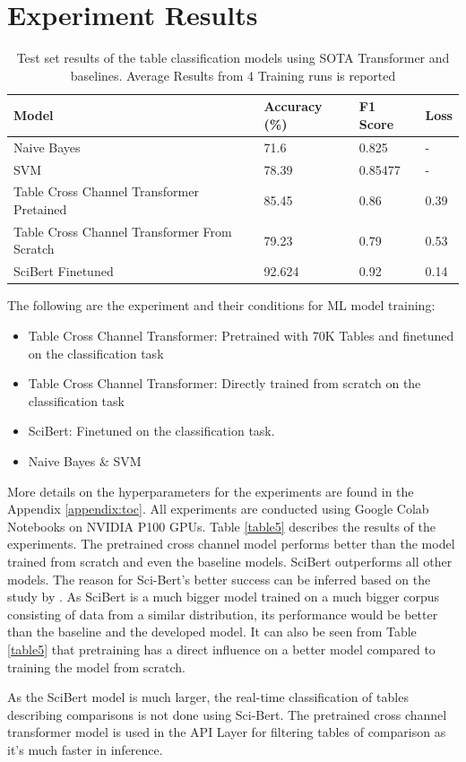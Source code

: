 \section{Experiment Results}
\label{table_classification:experiement-result}
\begin{table}[h]
    \label{table\arabic{tablecounter}}
    \centering
    \begin{tabular}{|l|l|l|l|}
    \hline
        \textbf{Model} & \textbf{Accuracy} (\%) & \textbf{F1 Score}  & \textbf{Loss} \\ \hline
        Naive Bayes & 71.6 & 0.825 & - \\ \hline
        SVM  & 78.39 & 0.85477 & - \\ \hline
        Table Cross Channel Transformer Pretained & 85.45 & 0.86 & 0.39 \\ \hline
        Table Cross Channel Transformer From Scratch & 79.23 & 0.79 & 0.53 \\ \hline
        SciBert Finetuned & 92.624 & 0.92 & 0.14 \\ \hline
    \end{tabular}
    \caption{\label{tablecounter} Test set results of the table classification models using SOTA Transformer and baselines. Average Results from 4 Training runs is reported}
\end{table}
The following are the experiment and their conditions for ML model training:
\begin{itemize}
    \item Table Cross Channel Transformer: Pretrained with 70K Tables and finetuned on the classification task
    \item Table Cross Channel Transformer: Directly trained from scratch on the classification task 
    \item SciBert: Finetuned on the classification task.
    \item Naive Bayes \& SVM
\end{itemize}
More details on the hyperparameters for the experiments are found in the Appendix \ref{appendix:toc}.
All experiments are conducted using Google Colab Notebooks on NVIDIA P100 GPUs. Table \ref{table5} describes the results of the experiments. The pretrained cross channel model performs better than the model trained from scratch and even the baseline models. SciBert outperforms all other models. The reason for Sci-Bert's better success can be inferred based on the study by \cite{hernandez2021scaling}. As SciBert is a much bigger model trained on a much bigger corpus consisting of data from a similar distribution, its performance would be better than the baseline and the developed model. It can also be seen from Table \ref{table5} that pretraining has a direct influence on a better model compared to training the model from scratch. 


As the SciBert model is much larger, the real-time classification of tables describing comparisons is not done using Sci-Bert. The pretrained cross channel transformer model is used in the API Layer for filtering tables of comparison as it's much faster in inference. 

